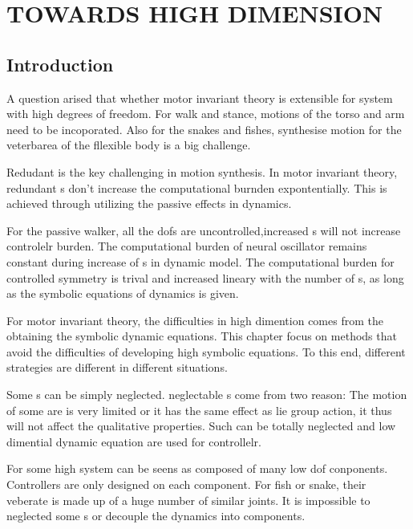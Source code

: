 \chapter{TOWARDS HIGH DIMENSION}
\label{chap:highdor}
\graphicspath{{HiDof/HiDofFigs/EPS/}{HiDof/HiDofFigs/}}
\section{Introduction}
A question arised that whether motor invariant theory is extensible for system with high degrees of freedom.
For walk and stance, motions of the torso and arm need to be incoporated.
Also for the snakes and fishes, synthesise motion for the veterbarea of the fllexible body is a big challenge.
 



Redudant \dof is the key challenging in motion synthesis.
In motor invariant theory, redundant \dof s don't increase the computational burnden expontentially.
This is achieved through utilizing the passive effects in dynamics.

For the passive walker, all the dofs are uncontrolled,increased \dof s will not increase controlelr burden.
The computational burden of neural oscillator remains constant during increase of \dof s in dynamic model.
The computational burden for controlled symmetry is trival and increased lineary with the number of \dof s, as long as the symbolic equations of dynamics is given.

For motor invariant theory, the difficulties in high dimention comes from  the obtaining the symbolic dynamic equations.
This chapter focus on methods that avoid the difficulties of developing high \dof symbolic equations.
To this end, different strategies are different in different situations.
\begin{itemize}

Some \dof s can be simply neglected.
neglectable \dof s come from two reason:
The motion of some \dof are is very limited or it has the same effect as lie group action, it thus will not affect the qualitative properties.
Such \dofs can be totally neglected and low dimential dynamic equation are used for controllelr.

For some high \dof system can be seens as composed of many low dof conponents.
Controllers are only designed on each component.
For fish or snake, their veberate is made up of a huge number of similar joints.
It is impossible to neglected some \dof s or decouple the dynamics into components.


\end{itemize} 

